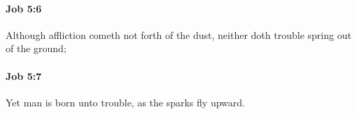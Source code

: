 		\paragraph{Job 5:6} %
			\label{JOB-5-6}

			Although affliction cometh not forth of the dust, neither doth trouble spring out of the ground;


		\paragraph{Job 5:7} %
			\label{JOB-5-7}

			Yet man is born unto trouble, as the sparks fly upward.


